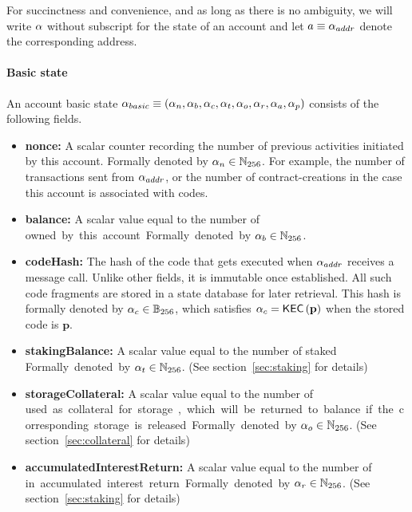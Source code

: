 For succinctness and convenience, and as long as there is no ambiguity, we will write $\mathbf{\alpha}$ without subscript for the state of an account and let $a\equiv \mathbf{\alpha}_{addr}$ denote the corresponding address.

\paragraph{Basic state}

An account basic state $\mathbf{\alpha}_{basic} \equiv\left( \mathbf{\alpha}_n, \mathbf{\alpha}_b, \mathbf{\alpha}_c,\mathbf{\alpha}_t, \mathbf{\alpha}_o, \mathbf{\alpha}_r, \mathbf{\alpha}_a, \mathbf{\alpha}_p\right)$ consists of the following fields. 
\begin{itemize}[nosep]
	\item {\bf nonce:} A scalar counter recording the number of previous activities initiated by this account. Formally denoted by $\mathbf{\alpha}_n\in \mathbb{N}_{256}$. For example, the number of transactions sent from $\mathbf{\alpha}_{addr}$, or the number of contract-creations in the case this account is associated with codes.

	\item {\bf balance:} A scalar value equal to the number of \unit  owned by this account. Formally denoted by $\mathbf{\alpha}_b\in \mathbb{N}_{256}$. 

	\item {\bf codeHash:} The hash of the \cvm code  that gets executed when $\mathbf{\alpha}_{addr}$ receives a message call. 
	Unlike other fields, it is immutable once established. All such code fragments are stored in a state database for later retrieval. This hash is formally denoted by $\mathbf{\alpha}_c\in \mathbb{B}_{256}$,
	which satisfies $\mathbf{\alpha}_c=\mathsf{KEC}\left(\mathbf{p} \right)$ when the stored code is $\mathbf{p}$.  

	\item {\bf stakingBalance:} A scalar value equal to the number of staked \unit. Formally denoted by $\mathbf{\alpha}_t\in \mathbb{N}_{256}$. (See section~\ref{sec:staking} for details)
	
	\item {\bf storageCollateral:} A scalar value equal to the number of \unit used as collateral for storage, which will be returned to balance if the corresponding storage is released. Formally denoted by $\mathbf{\alpha}_o\in \mathbb{N}_{256}$. (See section~\ref{sec:collateral} for details)
	
	\item {\bf accumulatedInterestReturn:} A scalar value equal to the number of \unit in accumulated interest return. Formally denoted by $\mathbf{\alpha}_r\in \mathbb{N}_{256}$. (See section~\ref{sec:staking} for details)
	

\end{itemize}
